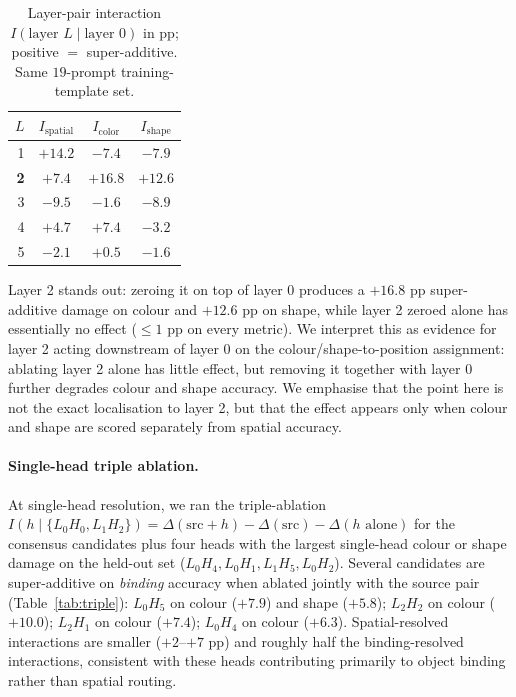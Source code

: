 \documentclass{article}
\theoremstyle{plain}
\theoremstyle{definition}
\begin{document}
\begin{table}[t]
\centering
\small
\caption{Layer-pair interaction $I(\text{layer }L \mid \text{layer }0)$ in pp; positive $=$ super-additive. Same $19$-prompt training-template set.}
\label{tab:layer_pair}
\begin{tabular}{rccc}
\toprule
$L$ & $I_\text{spatial}$ & $I_\text{color}$ & $I_\text{shape}$ \\
\midrule
1 & $+14.2$ & $-7.4$ & $-7.9$ \\
\textbf{2} & $\mathbf{+7.4}$ & $\mathbf{+16.8}$ & $\mathbf{+12.6}$ \\
3 & $-9.5$ & $-1.6$ & $-8.9$ \\
4 & $+4.7$ & $+7.4$ & $-3.2$ \\
5 & $-2.1$ & $+0.5$ & $-1.6$ \\
\bottomrule
\end{tabular}
\end{table}

Layer 2 stands out: zeroing it on top of layer 0 produces a $+16.8$ pp super-additive damage on colour and $+12.6$ pp on shape, while layer 2 zeroed alone has essentially no effect ($\leq 1$ pp on every metric). We interpret this as evidence for layer 2 acting downstream of layer 0 on the colour/shape-to-position assignment: ablating layer 2 alone has little effect, but removing it together with layer 0 further degrades colour and shape accuracy. We emphasise that the point here is not the exact localisation to layer 2, but that the effect appears only when colour and shape are scored separately from spatial accuracy.

\paragraph{Single-head triple ablation.}
At single-head resolution, we ran the triple-ablation $I(h \mid \{L_0H_0, L_1H_2\}) = \Delta(\text{src}+h) - \Delta(\text{src}) - \Delta(h\text{ alone})$ for the consensus candidates plus four heads with the largest single-head colour or shape damage on the held-out set ($L_0H_4, L_0H_1, L_1H_5, L_0H_2$). Several candidates are super-additive on \emph{binding} accuracy when ablated jointly with the source pair (Table~\ref{tab:triple}): $L_0H_5$ on colour ($+7.9$) and shape ($+5.8$); $L_2H_2$ on colour ($+10.0$); $L_2H_1$ on colour ($+7.4$); $L_0H_4$ on colour ($+6.3$). Spatial-resolved interactions are smaller ($+2$--$+7$ pp) and roughly half the binding-resolved interactions, consistent with these heads contributing primarily to object binding rather than spatial routing.
\end{document}
